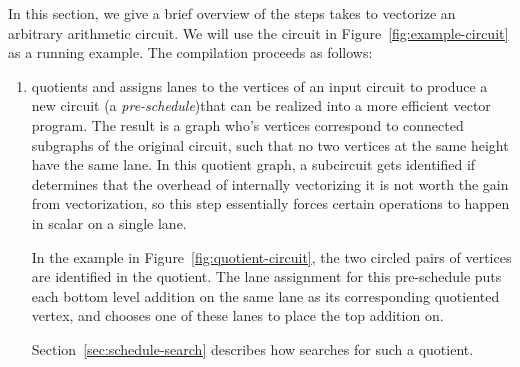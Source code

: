 In this section, we give a brief overview of the steps \system takes to vectorize an arbitrary arithmetic circuit.
We will use the circuit in Figure~\ref{fig:example-circuit} as a running example.
The compilation proceeds as follows:
\begin{enumerate}
    \item \system quotients and assigns lanes to the vertices of an input circuit to produce a new circuit (a {\em pre-schedule})that can be realized into a more efficient vector program. The result is a graph who's vertices correspond to connected subgraphs of the original circuit, such that no two vertices at the same height have the same lane. In this quotient graph, a subcircuit gets identified if \system determines that the overhead of internally vectorizing it is not worth the gain from vectorization, so this step essentially forces certain operations to happen in scalar on a single lane. 
    
    In the example in Figure~\ref{fig:quotient-circuit}, the two circled pairs of vertices are identified in the quotient.
    The lane assignment for this pre-schedule puts each bottom level addition on the same lane as its corresponding quotiented vertex, and chooses one of these lanes to place the top addition on.

    Section~\ref{sec:schedule-search} describes how \system searches for such a quotient. 
    

\end{enumerate}
